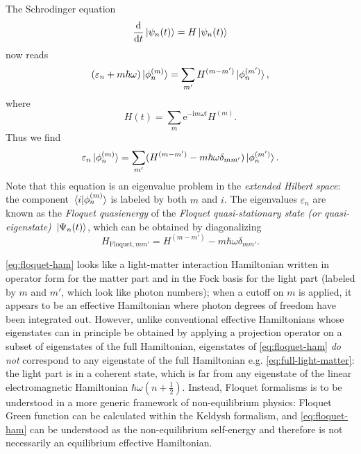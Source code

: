 \documentclass[hyperref, a4paper]{article}
\newcommand*{\ii}{\mathrm{i}}
\newcommand*{\ee}{\mathrm{e}}
\begin{document}
The Schrodinger equation 
\begin{equation}
    \dv{t} \ket*{\psi_n(t)} = H \ket*{\psi_n(t)}
\end{equation}
now reads 
\begin{equation}
    (\varepsilon_n + m \hbar \omega) \ket*{\phi_n^{(m)}} 
    = \sum_{m'} H^{(m - m')} \ket*{\phi_n^{(m')}},
\end{equation}
where 
\begin{equation}
    H(t) = \sum_{m} \ee^{- \ii m \omega t} H^{(m)}.
\end{equation}
Thus we find 
\begin{equation}
    \varepsilon_n \ket*{\phi^{(m)}_n}
    = \sum_{m'} (
        H^{(m - m')} - m \hbar \omega \delta_{m m'}
    ) \ket*{\phi^{(m')}_{n}}.
    \label{eq:floquet-ham-eigen}
\end{equation}
Note that this equation is an eigenvalue problem in the \emph{extended Hilbert space}:
the component $\braket*{i}{\phi_n^{(m)}}$ is labeled by both $m$ and $i$.
The eigenvalues $\varepsilon_n$ are known as the \emph{Floquet quasienergy} of 
the \emph{Floquet quasi-stationary state (or quasi-eigenstate)} $\ket*{\Psi_n(t)}$,
which can be obtained by diagonalizing 
\begin{equation}
    H_{\text{Floquet}, mm'} = H^{(m - m')} - m \hbar \omega \delta_{m m'}.
    \label{eq:floquet-ham}
\end{equation}

\eqref{eq:floquet-ham} looks like a light-matter interaction Hamiltonian 
written in operator form for the matter part 
and in the Fock basis for the light part (labeled by $m$ and $m'$, which look like photon numbers);
when a cutoff on $m$ is applied, 
it appears to be an effective Hamiltonian where photon degrees of freedom 
have been integrated out.
However, unlike conventional effective Hamiltonians
whose eigenstates can in principle be obtained by 
applying a projection operator on a subset of eigenstates of the full Hamiltonian,
eigenstates of \eqref{eq:floquet-ham} 
\emph{do not} correspond to any eigenstate of 
the full Hamiltonian e.g. \eqref{eq:full-light-matter}:
the light part is in a coherent state,
which is far from any eigenstate of the linear electromagnetic Hamiltonian $\hbar \omega (n + \frac{1}{2})$.
Instead, Floquet formalisms is to be understood in a more generic framework of non-equilibrium physics:
Floquet Green function can be calculated within the Keldysh formalism,
and \eqref{eq:floquet-ham} can be understood as the 
non-equilibrium self-energy \cite{lubatsch2019evolution,aoki2014nonequilibrium}
and therefore is not necessarily an equilibrium effective Hamiltonian.
\end{document}
